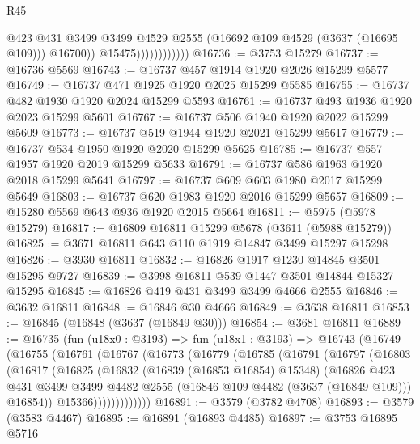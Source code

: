 \begin{lexlean}{R45}
\begin{coremodule}
                                @423
                                @431
                                @3499
                                @3499
                                @4529
                                @2555
                                (@16692 @109 @4529 (@3637 (@16695 @109)))
                                @16700))
                            @15475))))))))))))
@16736 := @3753 @15279
@16737 := @16736 @5569
@16743 := @16737 @457 @1914 @1920 @2026 @15299 @5577
@16749 := @16737 @471 @1925 @1920 @2025 @15299 @5585
@16755 := @16737 @482 @1930 @1920 @2024 @15299 @5593
@16761 := @16737 @493 @1936 @1920 @2023 @15299 @5601
@16767 := @16737 @506 @1940 @1920 @2022 @15299 @5609
@16773 := @16737 @519 @1944 @1920 @2021 @15299 @5617
@16779 := @16737 @534 @1950 @1920 @2020 @15299 @5625
@16785 := @16737 @557 @1957 @1920 @2019 @15299 @5633
@16791 := @16737 @586 @1963 @1920 @2018 @15299 @5641
@16797 := @16737 @609 @603 @1980 @2017 @15299 @5649
@16803 := @16737 @620 @1983 @1920 @2016 @15299 @5657
@16809 := @15280 @5569 @643 @936 @1920 @2015 @5664
@16811 := @5975 (@5978 @15279)
@16817 := @16809 @16811 @15299 @5678 (@3611 (@5988 @15279))
@16825 := @3671 @16811 @643 @110 @1919 @14847 @3499 @15297 @15298
@16826 := @3930 @16811
@16832 := @16826 @1917 @1230 @14845 @3501 @15295 @9727
@16839 := @3998 @16811 @539 @1447 @3501 @14844 @15327 @15295
@16845 := @16826 @419 @431 @3499 @3499 @4666 @2555
@16846 := @3632 @16811
@16848 := @16846 @30 @4666
@16849 := @3638 @16811
@16853 := @16845 (@16848 (@3637 (@16849 @30)))
@16854 := @3681 @16811
@16889 := @16735
    (fun (u18x0 : @3193) =>
    fun (u18x1 : @3193) =>
    @16743
      (@16749
        (@16755
          (@16761
            (@16767
              (@16773
                (@16779
                  (@16785
                    (@16791
                      (@16797
                        (@16803
                          (@16817
                            (@16825
                              (@16832
                                (@16839 (@16853 @16854) @15348)
                                (@16826
                                  @423
                                  @431
                                  @3499
                                  @3499
                                  @4482
                                  @2555
                                  (@16846 @109 @4482 (@3637 (@16849 @109)))
                                  @16854))
                              @15366)))))))))))))
@16891 := @3579 (@3782 @4708)
@16893 := @3579 (@3583 @4467)
@16895 := @16891 (@16893 @4485)
@16897 := @3753 @16895 @5716

\end{coremodule}
\end{lexlean}
